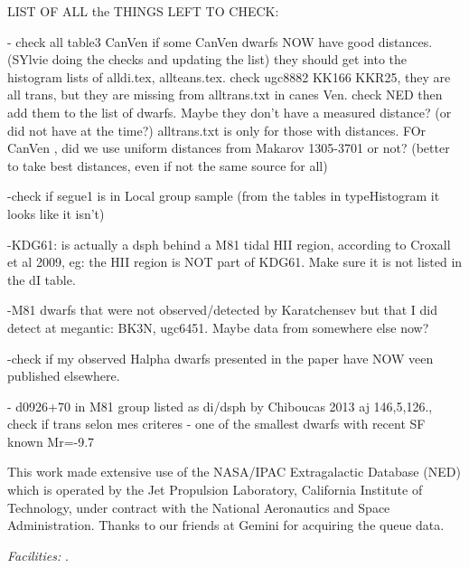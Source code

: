 \documentclass[12pt,preprint]{aastex}
\begin{document}
LIST OF ALL the THINGS LEFT TO CHECK:

- check all table3 CanVen if some CanVen dwarfs NOW have good distances. (SYlvie doing the checks and updating the list)
  they should get into the histogram lists of alldi.tex, allteans.tex.
 check ugc8882 KK166 KKR25, they are all trans, but they are missing from alltrans.txt in canes Ven. check NED then add them to the list of dwarfs. Maybe they don't have a 
 measured distance? (or did not have at the time?) alltrans.txt is only for those with distances.
FOr CanVen , did we use uniform distances from Makarov 1305-3701 or not? (better to take best distances, even if not the same source for all)

-check if segue1 is in Local group sample (from the tables in typeHistogram it looks like it isn't)

-KDG61: is actually a dsph behind a M81 tidal HII region, according to Croxall et al 2009, eg: the HII region is NOT part of KDG61. Make sure it is not listed in the dI table.

-M81 dwarfs that were not observed/detected by Karatchensev but that I did detect at megantic: BK3N, ugc6451. Maybe data from somewhere else now?


-check if my observed Halpha dwarfs presented in the paper have NOW veen published elsewhere.

- d0926+70 in M81 group listed as di/dsph by Chiboucas 2013 aj 146,5,126., check if trans selon mes criteres - one of the smallest dwarfs with recent SF known Mr=-9.7

\acknowledgments

This work made extensive use of the NASA/IPAC Extragalactic Database (NED) which is operated by the Jet Propulsion Laboratory, California Institute of Technology, 
under contract with the National Aeronautics and Space Administration. Thanks to our friends at Gemini for acquiring the queue data.


{\it Facilities:}  .

\end{document}
